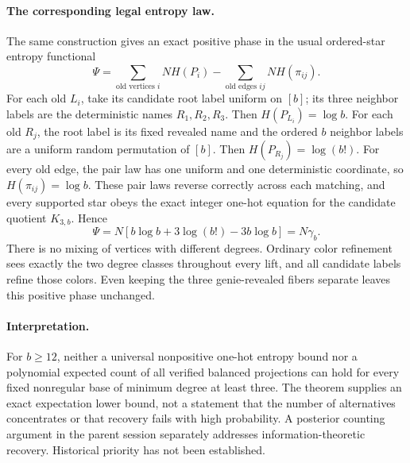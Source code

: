 \documentclass[11pt]{article}
\begin{document}
\paragraph{The corresponding legal entropy law.}
The same construction gives an exact positive phase in the usual
ordered-star entropy functional
\[
 \Psi=\sum_{\text{old vertices }i}N H(P_i)
          -\sum_{\text{old edges }ij}N H(\pi_{ij}).
\]
For each old $L_i$, take its candidate root label uniform on $[b]$;
its three neighbor labels are the deterministic names $R_1,R_2,R_3$.
Then $H(P_{L_i})=\log b$.
For each old $R_j$, the root label is its fixed revealed name and the
ordered $b$ neighbor labels are a uniform random permutation of $[b]$.
Then $H(P_{R_j})=\log(b!)$.
For every old edge, the pair law has one uniform and one deterministic
coordinate, so $H(\pi_{ij})=\log b$. These pair laws reverse correctly
across each matching, and every supported star obeys the exact integer
one-hot equation for the candidate quotient $K_{3,b}$. Hence
\[
 \Psi=N[b\log b+3\log(b!)-3b\log b]=N\gamma_b.
\]
There is no mixing of vertices with different degrees. Ordinary color
refinement sees exactly the two degree classes throughout every lift,
and all candidate labels refine those colors. Even keeping the three
genie-revealed fibers separate leaves this positive phase unchanged.

\paragraph{Interpretation.}
For $b\ge12$, neither a universal nonpositive one-hot entropy bound nor
a polynomial expected count of all verified balanced projections can
hold for every fixed nonregular base of minimum degree at least three.
The theorem supplies an exact expectation lower bound, not a statement
that the number of alternatives concentrates or that recovery fails
with high probability. A posterior counting argument in the parent
session separately addresses information-theoretic recovery. Historical
priority has not been established.
\end{document}
